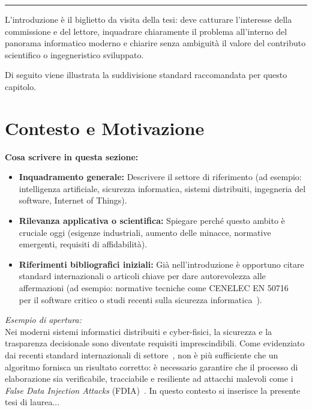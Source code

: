 \noindent\rule{\textwidth}{1.2pt}
\vspace{0.4cm}

L'introduzione è il biglietto da visita della tesi: deve catturare l'interesse della commissione e del lettore, inquadrare chiaramente il problema all'interno del panorama informatico moderno e chiarire senza ambiguità il valore del contributo scientifico o ingegneristico sviluppato.

Di seguito viene illustrata la suddivisione standard raccomandata per questo capitolo.


\section{Contesto e Motivazione}
\label{sec:contesto-motivazione}

\textbf{Cosa scrivere in questa sezione:}
\begin{itemize}
    \item \textbf{Inquadramento generale:} Descrivere il settore di riferimento (ad esempio: intelligenza artificiale, sicurezza informatica, sistemi distribuiti, ingegneria del software, Internet of Things).
    \item \textbf{Rilevanza applicativa o scientifica:} Spiegare perché questo ambito è cruciale oggi (esigenze industriali, aumento delle minacce, normative emergenti, requisiti di affidabilità).
    \item \textbf{Riferimenti bibliografici iniziali:} Già nell'introduzione è opportuno citare standard internazionali o articoli chiave per dare autorevolezza alle affermazioni (ad esempio: normative tecniche come CENELEC EN 50716~\cite{en50716} per il software critico o studi recenti sulla sicurezza informatica~\cite{soderi2023railway}).
\end{itemize}

\textit{Esempio di apertura:}\\
Nei moderni sistemi informatici distribuiti e cyber-fisici, la sicurezza e la trasparenza decisionale sono diventate requisiti imprescindibili. Come evidenziato dai recenti standard internazionali di settore~\cite{en50716, soderi2023railway}, non è più sufficiente che un algoritmo fornisca un risultato corretto: è necessario garantire che il processo di elaborazione sia verificabile, tracciabile e resiliente ad attacchi malevoli come i \emph{False Data Injection Attacks} (FDIA)~\cite{liu2009false}. In questo contesto si inserisce la presente tesi di laurea...


